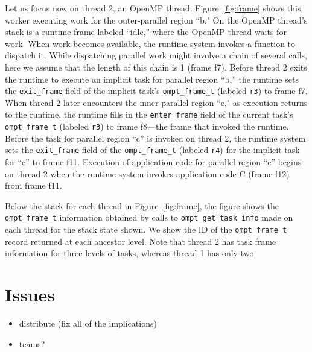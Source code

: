 \documentclass{article}
\begin{document}
Let us focus now on thread 2, an OpenMP thread. Figure~\ref{fig:frame}  shows this worker executing  work for the outer-parallel region ``b."
On the OpenMP thread's stack is a runtime frame labeled ``idle,'' where the OpenMP thread waits for work. 
When work becomes available, the runtime system invokes a function to dispatch it. While dispatching parallel work might involve a chain of several calls, here we assume that the length of this chain is 1 (frame f7).  Before thread 2 exits the runtime to execute an implicit task for parallel region ``b,'' the runtime 
sets the \verb|exit_frame| field of the implicit task's \verb|ompt_frame_t| (labeled \verb|r3|) to frame f7. 
When thread 2 later encounters the inner-parallel region ``c,"  as execution returns to the runtime,  the runtime fills in the  \verb|enter_frame| field of the current task's \verb|ompt_frame_t| (labeled \verb|r3|) to frame f8---the frame that invoked the runtime. Before the task for parallel region ``c'' is invoked on thread 2, the runtime system sets the \verb|exit_frame| field  of the \verb|ompt_frame_t| (labeled \verb|r4|) for the implicit task for ``c'' 
to frame f11. Execution of application code for parallel region ``c''  begins on thread 2  when the runtime system invokes application code C (frame f12) from frame f11.


Below the stack for each thread in Figure~\ref{fig:frame}, the figure shows the \verb|ompt_frame_t| information obtained by calls to \verb|ompt_get_task_info| made on each thread for the stack state shown. We show the ID of the \verb|ompt_frame_t| record returned at each ancestor level. Note that thread 2 has task frame information for three levels of tasks, whereas thread 1 has only two.

\clearpage
{\color{red}
\section{Issues}
\begin{itemize}
\item distribute (fix all of the implications)
\item teams?
\end{itemize}
}
\end{document}
